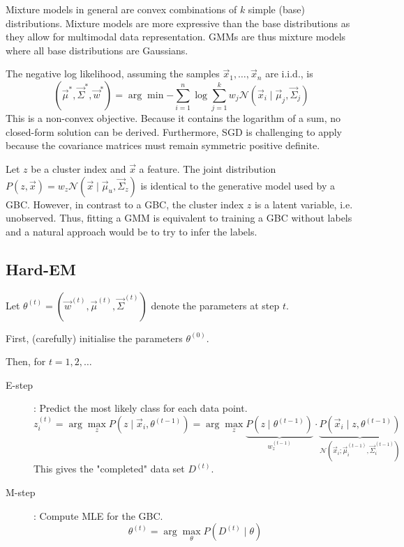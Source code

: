 Mixture models in general are convex combinations
of $k$ simple (base) distributions.
Mixture models are more expressive than
the base distributions as they allow
for multimodal data representation.
GMMs are thus mixture models where all
base distributions are Gaussians.

The negative log likelihood,
assuming the samples $\vec{x}_1, \dotsc, \vec{x}_n$
are i.i.d., is
\begin{equation*}
(\vec{\mu}^*, \vec{\Sigma}^*, \vec{w}^*)
= \arg\min{
	-\sum_{i=1}^n{\log{
			\sum_{j=1}^k{
				w_j \mathcal{N}(\vec{x}_i \mid \vec{\mu}_j, \vec{\Sigma}_j)
			}
	}}
}
\end{equation*}
This is a non-convex objective.
Because it contains the logarithm of a sum,
no closed-form solution can be derived.
Furthermore, SGD is challenging to apply because
the covariance matrices must remain symmetric positive definite.

Let $z$ be a cluster index and $\vec{x}$ a feature.
The joint distribution
$P(z, \vec{x}) = w_z \mathcal{N}(\vec{x} \mid \vec{\mu}_u, \vec{\Sigma}_z)$
is identical to the generative model used by a GBC.
However, in contrast to a GBC, the cluster index
$z$ is a latent variable, i.e. unobserved.
Thus, fitting a GMM is equivalent to training
a GBC without labels and
a natural approach would be to try to infer the labels.


\subsection{Hard-EM}
Let $\theta^{(t)} = (\vec{w}^{(t)}, \vec{\mu}^{(t)}, \vec{\Sigma}^{(t)})$
denote the parameters at step $t$.

First, (carefully) initialise the parameters
$\theta^{(0)}$.

Then, for $t = 1, 2, \dotsc$
\begin{description}
	\item[E-step]: Predict the most likely class for each data point.
	\begin{equation*}
	z_i^{(t)} = \arg\max_z{
		P(z \mid \vec{x}_i, \theta^{(t-1)})
	}
	= \arg\max_z{
		\underbrace{P(z \mid \theta^{(t-1)})}_{w_z^{(t-1)}}
		\cdot
		\underbrace{P(\vec{x}_i \mid z, \theta^{(t-1)})}_{\mathcal{N}(\vec{x}_i; \vec{\mu}_i^{(t-1)}, \vec{\Sigma}_i^{(t-1)})}
	}
	\end{equation*}
	This gives the "completed" data set $D^{(t)}$.
	\item[M-step]: Compute MLE for the GBC.
	\begin{equation*}
	\theta^{(t)} = \arg\max_\theta{P(D^{(t)} \mid \theta)}
	\end{equation*}
\end{description}

